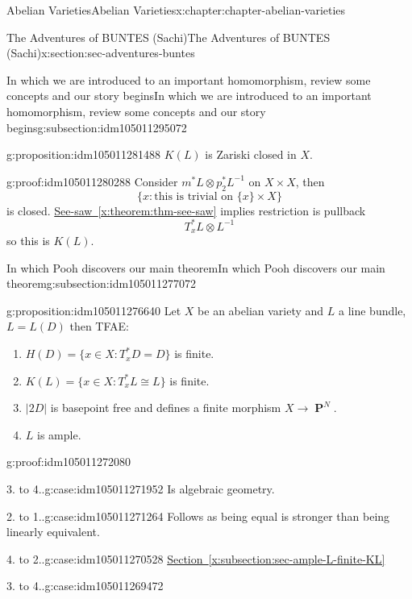 \documentclass[oneside,10pt,]{book}
\numberwithin{equation}{section}
\DeclareMathOperator{\PP}{\mathbf{P}}
\begin{document}
\begin{chapterptx}{Abelian Varieties}{}{Abelian Varieties}{}{}{x:chapter:chapter-abelian-varieties}
\begin{sectionptx}{The Adventures of BUNTES (Sachi)}{}{The Adventures of BUNTES (Sachi)}{}{}{x:section:sec-adventures-buntes}
\begin{subsectionptx}{In which we are introduced to an important homomorphism, review some concepts and our story begins}{}{In which we are introduced to an important homomorphism, review some concepts and our story begins}{}{}{g:subsection:idm105011295072}
\begin{proposition}{}{}{g:proposition:idm105011281488}
\(K(L)\) is Zariski closed in \(X\).%
\end{proposition}
\begin{proofptx}{}{g:proof:idm105011280288}
Consider \(m^* L \otimes p_2^*L^{-1}\) on \(X\times X\), then%
\begin{equation*}
\{x : \text{this is trivial on }\{x\}\times X\}
\end{equation*}
is closed. \hyperref[x:theorem:thm-see-saw]{See-saw~\ref{x:theorem:thm-see-saw}} implies restriction is pullback%
\begin{equation*}
T_x^*L \otimes L^{-1}
\end{equation*}
so this is \(K(L)\).%
\end{proofptx}
\end{subsectionptx}
%
%
\typeout{************************************************}
\typeout{************************************************}
%
\begin{subsectionptx}{In which Pooh discovers our main theorem}{}{In which Pooh discovers our main theorem}{}{}{g:subsection:idm105011277072}
\begin{proposition}{}{}{g:proposition:idm105011276640}%
Let \(X\) be an abelian variety and \(L\) a line bundle, \(L = L(D)\) then TFAE:%
\begin{enumerate}
\item{}\(H(D) = \{x\in X: T_x^*D  = D \}\) is finite.%
\item{}\(K(L) = \{x\in X: T_x^*L  \cong L \}\) is finite.%
\item{}\(|2D|\) is basepoint free and defines a finite morphism \(X\to \PP^N\).%
\item{}\(L\) is ample.%
\end{enumerate}
%
\end{proposition}
\begin{proofptx}{}{g:proof:idm105011272080}
\begin{case}{}{3. to 4..}{g:case:idm105011271952}
Is algebraic geometry.%
\end{case}
\begin{case}{}{2. to 1..}{g:case:idm105011271264}
Follows as being equal is stronger than being linearly equivalent.%
\end{case}
\begin{case}{}{4. to 2..}{g:case:idm105011270528}
\hyperref[x:subsection:sec-ample-L-finite-KL]{Section~\ref{x:subsection:sec-ample-L-finite-KL}}%
\end{case}
\begin{case}{}{3. to 4..}{g:case:idm105011269472}

\end{case}
\end{proofptx}
\end{subsectionptx}
\end{sectionptx}
\end{chapterptx}
\end{document}
